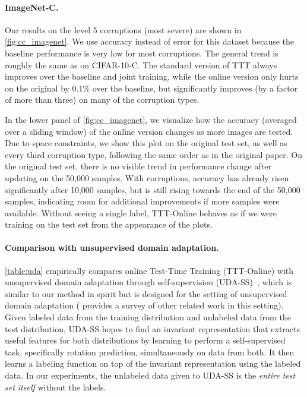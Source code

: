 \documentclass{article}
\theoremstyle{plain}
\theoremstyle{remark}
\theoremstyle{definition}
\begin{document}
\paragraph{ImageNet-C.}
Our results on the level 5 corruptions (most severe) are shown in \autoref{fig:cc_imagenet}. We use accuracy instead of error for this dataset 
because the baseline performance is very low for most corruptions.
The general trend is roughly the same as on CIFAR-10-C. The standard version of TTT always improves over the baseline and joint training, while the online version only hurts on the original by 0.1\% over the baseline, but significantly improves (by a factor of more than three) on many of the corruption types.

In the lower panel of \autoref{fig:cc_imagenet}, we visualize how the accuracy (averaged over a sliding window) of the online version changes as more images are tested.
Due to space constraints, we show this plot on the original test set, as well as every third corruption type, following the same order as in the original paper. 
On the original test set, there is no visible trend in performance change after updating on the 50,000 samples.
With corruptions, accuracy has already risen significantly after 10,000 samples, but is still rising towards the end of the 50,000 samples, indicating room for additional improvements if more samples were available.
Without seeing a single label, TTT-Online behaves as if we were training on the test set from the appearance of the plots. 

\paragraph{Comparison with unsupervised domain adaptation.}
\autoref{table:uda} empirically compares online Test-Time Training (TTT-Online) with unsupervised domain adaptation through self-supervision (UDA-SS)~\citep{sun2019uda}, which is similar to our method in spirit but is designed for the setting of unsupervised domain adaptation ( provides a survey of other related work in this setting). 
Given labeled data from the training distribution and unlabeled data from the test distribution, UDA-SS hopes to find an invariant representation that extracts useful features for both distributions by learning to perform a self-supervised task, specifically rotation prediction, simultaneously on data from both. It then learns a labeling function on top of the invariant representation using the labeled data. In our experiments, the unlabeled data given to UDA-SS is the \emph{entire test set itself} without the labels.
\end{document}
